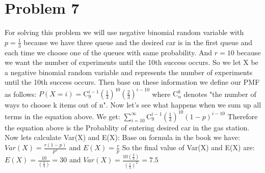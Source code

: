 \documentclass[12pt]{article}
\begin{document}
\section*{Problem 7}
For solving this problem we will use negative binomial random variable with $p=\frac{1}{3}$
because we have three queue and the desired car is in the first queue and each time we choose one of the queues
with same probability.
\newline And $r=10$ because we want the number of experiments until the 10th success occurs.
\newline So we let X be a negative binomial random variable and represents the number of experiments until the 10th success occurs.
\newline Then base on  these information we define our PMF as follows:
\newline \newline $P(X=i) =\mathrm{C}_{9}^{i-1}(\frac{1}{3})^{10}(\frac{2}{3})^{i-10} $
\newline \newline  where $\mathrm{C}_{n}^{k}$ denotes "the number of ways to choose k items out of n".
\newline Now let's see what happens when we sum up all terms in the equation above.
\newline We get:
\newline \newline $\sum_{i=10}^{\infty } \mathrm{C}_{9}^{i-1}(\frac{1}{3})^{10}(1-p)^{i-10}$
\newline \newline Therefore the equation above is the Probablity of entering desired car in the gas station.
\newline Now lets calculate Var(X) and E(X):
\newline Base on formula in the book we have:\newline \newline
$Var(X) = \frac{r(1-p)}{p^{2}}$ and $E(X)=\frac{r}{p}$
\newline \newline So the final value of Var(X) and  E(X) are:\newline \newline
$E(X)=\frac{10}{(\frac{1}{3})} = 30$  and  $Var(X)=\frac{10(\frac{2}{3})}{(\frac{1}{3})^{2}}=7.5$
\end{document}
